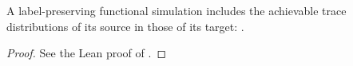 \begin{lemma}
  \label{lem:map}
  \leanok
  A label-preserving functional simulation includes the achievable trace distributions of its source in those of its target: .
\end{lemma}

\begin{proof}\leanok
  See the Lean proof of .
\end{proof}
